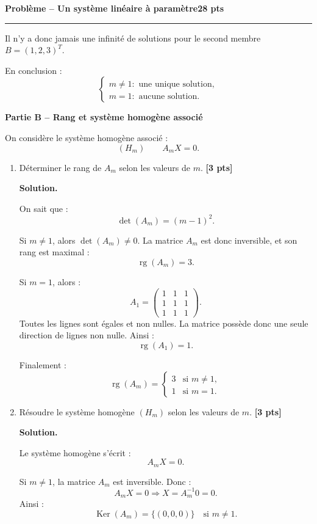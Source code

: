 \documentclass[11pt,a4paper]{article}
\newcommand{\pts}[1]{\hfill \textbf{[#1 pts]}}
\newcommand{\Ker}{\operatorname{Ker}}
\newcommand{\rg}{\operatorname{rg}}
\newcounter{probleme}
\newenvironment{probleme}[2]{
    \refstepcounter{probleme}
    \vspace{0.6cm}
    {\Large\color{bleu}\textbf{Problème \theprobleme{} -- #1}}\hfill \textbf{#2 pts}
    \par\medskip
    \hrule
    \medskip
}{\vspace{0.5cm}}
\newcommand{\partie}[1]{
    \vspace{0.35cm}
    {\large\color{gris}\textbf{#1}}
    \par\smallskip
}
\newcommand{\solution}{
    \textbf{\color{bleu}Solution. }
}
\begin{document}
\begin{probleme}{Un système linéaire à paramètre}{28}
\begin{enumerate}
    Il n'y a donc jamais une infinité de solutions pour le second membre \(B=(1,2,3)^T\).

    En conclusion :
    \[
    \boxed{
    \begin{cases}
    m\neq 1 : \text{ une unique solution},\\
    m=1 : \text{ aucune solution}.
    \end{cases}}
    \]
\end{enumerate}

\partie{Partie B -- Rang et système homogène associé}

On considère le système homogène associé :
\[
(H_m)\qquad A_mX=0.
\]

\begin{enumerate}[resume]
    \item Déterminer le rang de \(A_m\) selon les valeurs de \(m\). \pts{3}

    \solution

    On sait que :
    \[
    \det(A_m)=(m-1)^2.
    \]

    Si \(m\neq 1\), alors \(\det(A_m)\neq 0\). La matrice \(A_m\) est donc inversible, et son rang est maximal :
    \[
    \rg(A_m)=3.
    \]

    Si \(m=1\), alors :
    \[
    A_1=
    \begin{pmatrix}
    1&1&1\\
    1&1&1\\
    1&1&1
    \end{pmatrix}.
    \]
    Toutes les lignes sont égales et non nulles. La matrice possède donc une seule direction de lignes non nulle. Ainsi :
    \[
    \rg(A_1)=1.
    \]

    Finalement :
    \[
    \boxed{
    \rg(A_m)=
    \begin{cases}
    3 & \text{si } m\neq 1,\\
    1 & \text{si } m=1.
    \end{cases}}
    \]

    \item Résoudre le système homogène \((H_m)\) selon les valeurs de \(m\). \pts{3}

    \solution

    Le système homogène s'écrit :
    \[
    A_mX=0.
    \]

    Si \(m\neq 1\), la matrice \(A_m\) est inversible. Donc :
    \[
    A_mX=0
    \Longrightarrow
    X=A_m^{-1}0=0.
    \]
    Ainsi :
    \[
    \boxed{\Ker(A_m)=\{(0,0,0)\}\quad\text{si }m\neq 1.}
    \]


\end{enumerate}
\end{probleme}
\end{document}
